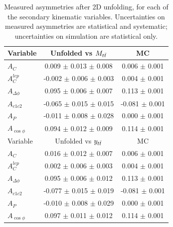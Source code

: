 \begin{table}[hbt]
\begin{center}
\caption{Measured asymmetries after 2D unfolding, for each of the
  secondary kinematic variables. Uncertainties on measured asymmetries
  are statistical and systematic; uncertainties on simulation are
  statistical only.}
\label{tab:afb:results2d:inclusive}
\begin{tabular}{l |  c  c }
\hline
Variable &  Unfolded vs $M_{t\bar{t}}$  &  MC \\ \hline
$A_{C}$                                 & 0.009 $\pm$ 0.013     $\pm$ 0.008      & 0.006 $\pm$  0.001 \\
$A^{lep}_{C}$                              & -0.002 $\pm$ 0.006 $\pm$ 0.003         & 0.004 $\pm$  0.001 \\
$A_{\Delta\phi}$        & 0.095 $\pm$ 0.006     $\pm$ 0.007          & 0.113 $\pm$  0.001 \\
$A_{c1c2}$                              & -0.065 $\pm$ 0.015 $\pm$ 0.015         & -0.081 $\pm$  0.001 \\
$A_{P}$                   & -0.011 $\pm$ 0.008 $\pm$ 0.028         & 0.000 $\pm$  0.001 \\
$A_{\cos\phi}$                              & 0.094 $\pm$ 0.012 $\pm$ 0.009      & 0.114 $\pm$  0.001 \\
 \hline

\hline
Variable &  Unfolded vs $y_{t\bar{t}}$  &  MC \\ \hline
$A_{C}$                                 & 0.016 $\pm$ 0.012     $\pm$ 0.007      & 0.006 $\pm$  0.001 \\
$A^{lep}_{C}$                              & 0.002 $\pm$ 0.006     $\pm$ 0.003          & 0.004 $\pm$  0.001 \\
$A_{\Delta\phi}$        & 0.095 $\pm$ 0.006     $\pm$ 0.012          & 0.113 $\pm$  0.001 \\
$A_{c1c2}$                              & -0.077 $\pm$ 0.015 $\pm$ 0.019         & -0.081 $\pm$  0.001 \\
$A_{P}$                   & -0.010 $\pm$ 0.008 $\pm$ 0.029         & 0.000 $\pm$  0.001 \\
$A_{\cos\phi}$                              & 0.097 $\pm$ 0.011     $\pm$ 0.012      & 0.114 $\pm$  0.001 \\
 \hline


\end{tabular}
\end{center}
\end{table}
